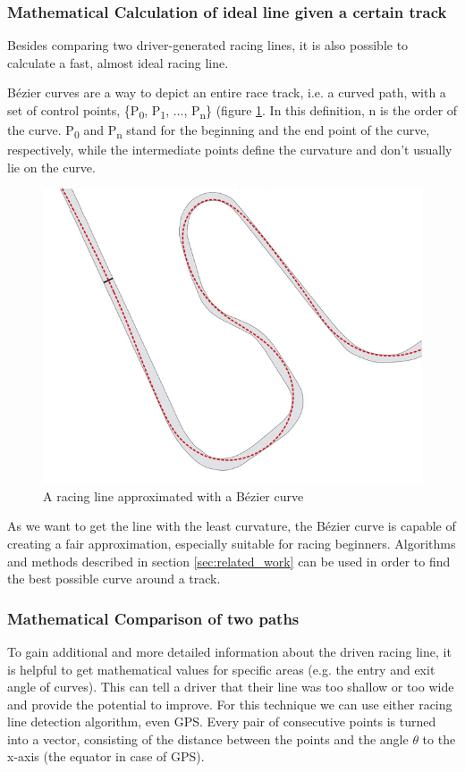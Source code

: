 \subsubsection{Mathematical Calculation of ideal line given a certain track}
Besides comparing two driver-generated racing lines, it is also possible to calculate a fast, almost ideal racing line.

Bézier curves are a way to depict an entire race track, i.e. a curved path, with a set of control points, \{P\textsubscript{0}, P\textsubscript{1}, ..., P\textsubscript{n}\} (figure \ref{fig:bezier}. In this definition, n is the order of the curve. P\textsubscript{0} and P\textsubscript{n} stand for the beginning and the end point of the curve, respectively, while the intermediate points define the curvature and don't usually lie on the curve.

\begin{figure}[!ht]
\includegraphics[width=\textwidth]{bezier_track}
\caption{A racing line approximated with a Bézier curve}
\label{fig:bezier}
\end{figure}


As we want to get the line with the least curvature, the Bézier curve is capable of creating a fair approximation, especially suitable for racing beginners.
Algorithms and methods described in section \ref{sec:related_work} can be used in order to find the best possible curve around a track.

\subsubsection{Mathematical Comparison of two paths}
To gain additional and more detailed information about the driven racing line, it is helpful to get mathematical values for specific areas (e.g. the entry and exit angle of curves). This can tell a driver that their line was too shallow or too wide and provide the potential to improve.
For this technique we can use either racing line detection algorithm, even GPS. Every pair of consecutive points is turned into a vector, consisting of the distance between the points and the angle $\theta$ to the x-axis (the equator in case of GPS).


